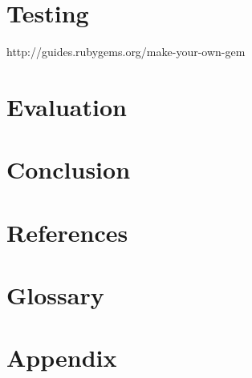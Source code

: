 \documentclass{article}
\begin{document}
\newpage
\section{Testing}

http://guides.rubygems.org/make-your-own-gem

\newpage
\section{Evaluation}

\newpage
\section{Conclusion}

\newpage
\section{References}


\renewcommand{\bibname}{}

\newpage
\section{Glossary}
\printglossary
\newpage
\section{Appendix}
\end{document}
